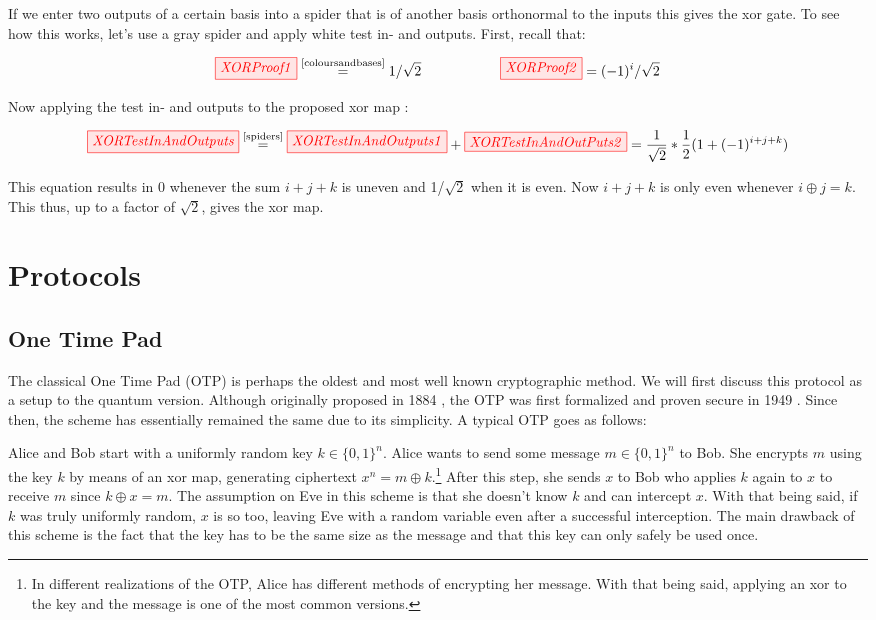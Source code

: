 \documentclass[]{article}
\newcommand{\equaltext}[1]{\ensuremath{\stackrel{\text{#1}}{=}}}
\begin{document}
If we enter two outputs of a certain basis into a spider that is of another basis orthonormal to the inputs this gives the xor gate. To see how this works, let's use a gray spider and apply white test in- and outputs. First, recall that:

\begin{equation}
	\tikzfig{XORProof1} \equaltext{\ref{coloursandbases}} 1/\sqrt{2} ~~~~~~~~~~~~~~~~~ \tikzfig{XORProof2} = (-1)^i/\sqrt{2}
\end{equation}

Now applying the test in- and outputs to the proposed xor map \cite{Coecke2017}:

\begin{equation}
	\tikzfig{XORTestInAndOutputs} \equaltext{\ref{spiders}} \tikzfig{XORTestInAndOutputs1} + \tikzfig{XORTestInAndOutPuts2} = \frac{1}{\sqrt{2}} * \frac{1}{2}(1+(-1)^{i+j+k})
\end{equation}

This equation results in 0 whenever the sum $i+j+k$ is uneven and 1/$\sqrt{2}$ when it is even. Now $i+j+k$ is only even whenever $i \oplus j = k$. This thus, up to a factor of $\sqrt{2}$, gives the xor map.

\section{Protocols}


\subsection{One Time Pad}

The classical One Time Pad (OTP) is perhaps the oldest and most well known cryptographic method. We will first discuss this protocol as a setup to the quantum version. Although originally proposed in 1884 \cite{Markoff2011}, the OTP was first formalized and proven secure in 1949 \cite{Shannon1949}. Since then, the scheme has essentially remained the same due to its simplicity. A typical OTP goes as follows:

Alice and Bob start with a uniformly random key $k \in \{0,1\}^n$. Alice wants to send some message $m \in \{0,1\}^n$ to Bob. She encrypts $m$ using the key $k$ by means of an xor map, generating ciphertext $x^n = m \oplus k$.\footnote{In different realizations of the OTP, Alice has different methods of encrypting her message. With that being said, applying an xor to the key and the message is one of the most common versions.} After this step, she sends $x$ to Bob who applies $k$ again to $x$ to receive $m$ since $k \oplus x = m$. The assumption on Eve in this scheme is that she doesn't know $k$ and can intercept $x$. With that being said, if $k$ was truly uniformly random, $x$ is so too, leaving Eve with a random variable even after a successful interception. The main drawback of this scheme is the fact that the key has to be the same size as the message and that this key can only safely be used once.
\end{document}
